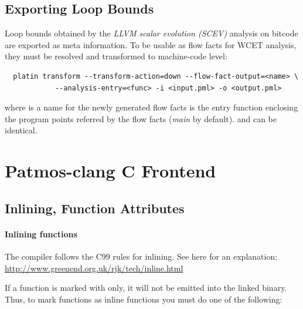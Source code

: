 \subsection{Exporting Loop Bounds}

Loop bounds obtained by the \emph{LLVM scalar evolution (SCEV)} analysis
on bitcode are exported as meta information.
%
To be usable as flow facts for WCET analysis, they must be resolved and
transformed to machine-code level:

\begin{verbatim}
  platin transform --transform-action=down --flow-fact-output=<name> \
            --analysis-entry=<func> -i <input.pml> -o <output.pml>
\end{verbatim}

where  is a name for the newly generated flow facts
\code{<func>} is the entry function enclosing the program points referred by
the flow facts (\emph{main} by default).
%
 and  can be identical.



\section{Patmos-clang C Frontend}
\label{sec:toolchain:frontend}

\subsection{Inlining, Function Attributes}

\paragraph{Inlining functions}
The compiler follows the C99 rules for inlining. See here for an explanation:
%
\url{http://www.greenend.org.uk/rjk/tech/inline.html}

If a function is marked with  only, it will not be emitted into the linked binary.
Thus, to mark functions as inline functions you must do one of the following:

